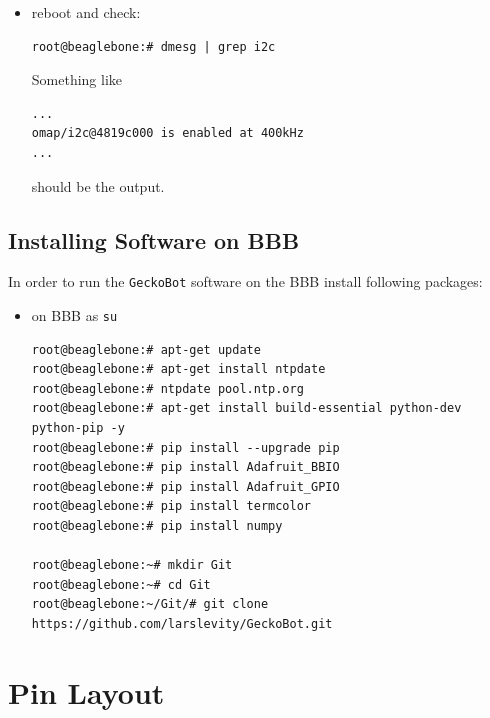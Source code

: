 \documentclass[
	fontsize=10pt
	paper=a4
]{scrartcl}
\begin{document}
\begin{itemize}
\item reboot and check:
\begin{lstlisting}
root@beaglebone:# dmesg | grep i2c
\end{lstlisting}
Something like
\begin{lstlisting}
... 
omap/i2c@4819c000 is enabled at 400kHz
...
\end{lstlisting}
should be the output.


\end{itemize}















\subsection{Installing Software on BBB}
In order to run the \texttt{GeckoBot} software on the BBB install following packages:
\begin{itemize}
\item on BBB as \texttt{su}
\begin{lstlisting}
root@beaglebone:# apt-get update
root@beaglebone:# apt-get install ntpdate
root@beaglebone:# ntpdate pool.ntp.org
root@beaglebone:# apt-get install build-essential python-dev python-pip -y
root@beaglebone:# pip install --upgrade pip
root@beaglebone:# pip install Adafruit_BBIO
root@beaglebone:# pip install Adafruit_GPIO
root@beaglebone:# pip install termcolor
root@beaglebone:# pip install numpy

root@beaglebone:~# mkdir Git
root@beaglebone:~# cd Git
root@beaglebone:~/Git/# git clone https://github.com/larslevity/GeckoBot.git

\end{lstlisting}
\end{itemize}








\clearpage

\section{Pin Layout}
\end{document}
